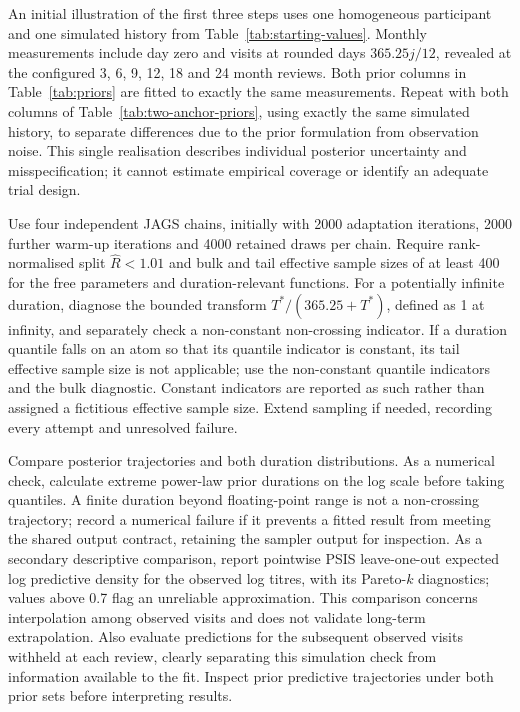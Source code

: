 \documentclass[11pt,a4paper]{article}
\begin{document}
An initial illustration of the first three steps uses one homogeneous
participant and one simulated history from Table~\ref{tab:starting-values}.
Monthly measurements include day zero and visits at rounded days
$365.25j/12$, revealed at the configured 3, 6, 9, 12, 18 and 24 month
reviews. Both prior columns in Table~\ref{tab:priors} are fitted to exactly
the same measurements. Repeat with both columns of
Table~\ref{tab:two-anchor-priors}, using exactly the same simulated history,
to separate differences due to the prior formulation from observation
noise. This single realisation describes individual
posterior uncertainty and misspecification; it cannot estimate empirical
coverage or identify an adequate trial design.

Use four independent JAGS chains, initially with 2000 adaptation iterations,
2000 further warm-up iterations and 4000 retained draws per chain. Require
rank-normalised split $\widehat R<1.01$ and bulk and tail effective sample
sizes of at least 400 for the free parameters and duration-relevant
functions. For a potentially infinite duration, diagnose the bounded
transform $T^*/(365.25+T^*)$, defined as 1 at infinity, and separately
check a non-constant non-crossing indicator. If a duration quantile falls
on an atom so that its quantile indicator is constant, its tail effective
sample size is not applicable; use the non-constant quantile indicators
and the bulk diagnostic. Constant indicators are reported as such rather
than assigned a fictitious effective sample size. Extend
sampling if needed, recording every attempt and unresolved failure.

Compare posterior trajectories and both duration distributions. As a
numerical check, calculate extreme power-law prior durations on the log
scale before taking quantiles. A finite duration beyond floating-point
range is not a non-crossing trajectory; record a numerical failure if it
prevents a fitted result from meeting the shared output contract, retaining
the sampler output for inspection. As a
secondary descriptive comparison, report pointwise PSIS leave-one-out
expected log predictive density for the observed log titres, with its
Pareto-$k$ diagnostics; values above 0.7 flag an unreliable approximation.
This comparison concerns interpolation among observed visits and does not
validate long-term extrapolation. Also evaluate predictions for the
subsequent observed visits withheld at each review, clearly separating this
simulation check from information available to the fit. Inspect prior
predictive trajectories under both prior sets before interpreting results.
\end{document}

